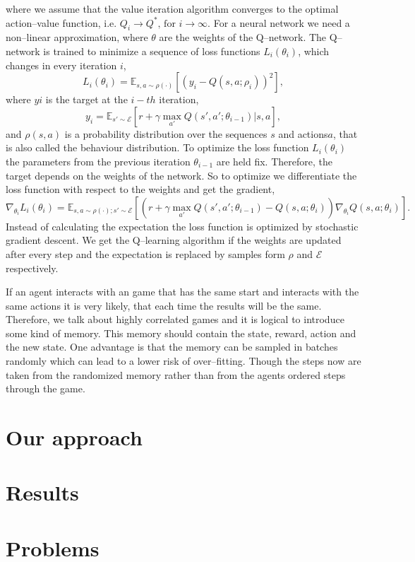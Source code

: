 where we assume that the value iteration algorithm converges to the optimal action--value function, i.e. $Q_i \rightarrow Q^*\text{, for } i \rightarrow \infty$.
For a neural network we need a non--linear approximation, where $\theta$ are the weights of the Q--network.
The Q--network is trained to minimize a sequence of loss functions $L_i\left(\theta_i\right)$, which changes in every iteration $i$,
\begin{equation}
L_i\left(\theta_i\right)= \mathbb{E}_{s,a \sim \rho \left( \cdot \right)}\left[ \left( y_i - Q\left(s,a;\rho_i \right) \right)^2\right],
\end{equation}
where $yi$ is the target at the $i-th$ iteration,
\begin{equation}
y_i = \mathbb{E}_{s'\sim \mathcal{E}}\left[ r+ \gamma \max_{a'} Q\left( s',a'; \theta_{i-1}\right)| s,a\right],
\end{equation}
and $\rho\left(s,a\right)$ is a probability distribution over the sequences $s$ and actions$a$, that is also called the behaviour distribution.
To optimize the loss function $L_i\left(\theta_i\right)$ the parameters from the previous iteration $\theta_{i-1}$ are held fix. 
Therefore, the target depends on the weights of the network. 
So to optimize we differentiate the loss function with respect to the weights and get the gradient,
\begin{equation}
\nabla_{\theta_i} L_i\left(\theta_i\right)= \mathbb{E}_{s,a\sim\rho\left(\cdot\right);s'\sim \mathcal{E}} \left[ \left( r + \gamma \max_{a'}Q\left(s',a';\theta_{i-1}\right) -Q\left(s,a;\theta_i\right) \right)\nabla_{\theta_i}Q\left(s,a;\theta_i\right)\right].
\end{equation}
Instead of calculating the expectation the loss function is optimized by stochastic gradient descent. 
We get the Q--learning algorithm if the weights are updated after every step and the expectation is replaced by samples form $\rho$ and $\mathcal{E}$ respectively.

If an agent interacts with an game that has the same start and interacts with the same actions it is very likely, that each time the results will be the same. 
Therefore, we talk about highly correlated games and it is logical to introduce some kind of memory. 
This memory should contain the state, reward, action and the new state. 
One advantage is that the memory can be sampled in batches randomly which can lead to a lower risk of over--fitting.
Though the steps now are taken from the randomized memory rather than from the agents ordered steps through the game.

\section{Our approach}

\section{Results}

\section{Problems}